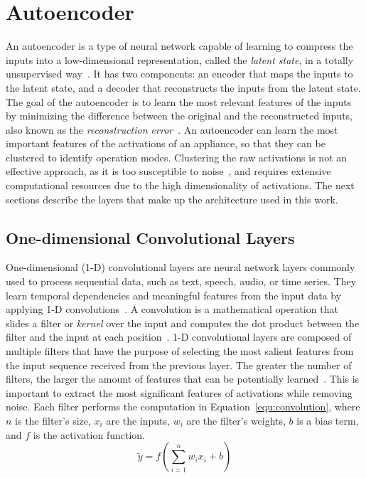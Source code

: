 \section{Autoencoder}

An autoencoder is a type of neural network capable of learning to compress the inputs into a low-dimensional representation, called the \textit{latent state}, in a totally unsupervised way~\parencite{hintonReducingDimensionalityData2006}. It has two components: an encoder that maps the inputs to the latent state, and a decoder that reconstructs the inputs from the latent state. The goal of the autoencoder is to learn the most relevant features of the inputs by minimizing the difference between the original and the reconstructed inputs, also known as the \textit{reconstruction error}~\parencite{hintonReducingDimensionalityData2006}. An autoencoder can learn the most important features of the activations of an appliance, so that they can be clustered to identify operation modes. Clustering the raw activations is not an effective approach, as it is too susceptible to noise~\parencite{castangiaClusteringApplianceOperation2023}, and requires extensive computational resources due to the high dimensionality of activations. The next sections describe the layers that make up the architecture used in this work.

\subsection{One-dimensional Convolutional Layers}

One-dimensional (1-D) convolutional layers are neural network layers commonly used to process sequential data, such as text, speech, audio, or time series. They learn temporal dependencies and meaningful features from the input data by applying 1-D convolutions~\parencite{kiranyaz1DConvolutionalNeural2021}. A convolution is a mathematical operation that slides a filter or \textit{kernel} over the input and computes the dot product between the filter and the input at each position~\parencite{rudinFunctionalAnalysis1991}. 1-D convolutional layers are composed of multiple filters that have the purpose of selecting the most salient features from the input sequence received from the previous layer. The greater the number of filters, the larger the amount of features that can be potentially learned~\parencite{castangiaClusteringApplianceOperation2023}. This is important to extract the most significant features of activations while removing noise. Each filter performs the computation in Equation~\eqref{equ:convolution}, where \(n\) is the filter's size, \(x_i\) are the inputs, \(w_i\) are the filter's weights, \(b\) is a bias term, and \(f\) is the activation function.
\begin{equation}\label{equ:convolution}
  \tilde{y} = f(\sum_{i=1}^{n}{w_i x_i} + b)
\end{equation}

